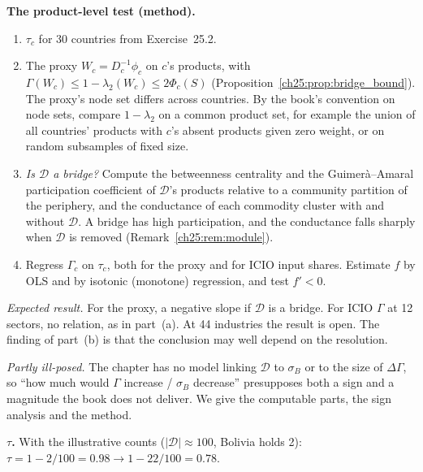 \documentclass[../solutions_manual.tex]{subfiles}
\begin{document}
 \textbf{The product-level test (method).}
\begin{enumerate}
\item $\tau_c$ for 30 countries from Exercise~25.2.
\item The proxy $W_c = D_c^{-1}\phi_c$ on $c$'s products, with $\Gamma(W_c) \le 1-\lambda_2(W_c) \le 2\Phi_c(S)$ (Proposition~\ref{ch25:prop:bridge_bound}). The proxy's node set differs across countries. By the book's convention on node sets, compare $1-\lambda_2$ on a common product set, for example the union of all countries' products with $c$'s absent products given zero weight, or on random subsamples of fixed size.
\item \emph{Is $\mathcal{D}$ a bridge?} Compute the betweenness centrality and the Guimer\`a--Amaral participation coefficient of $\mathcal{D}$'s products relative to a community partition of the periphery, and the conductance of each commodity cluster with and without $\mathcal{D}$. A bridge has high participation, and the conductance falls sharply when $\mathcal{D}$ is removed (Remark~\ref{ch25:rem:module}).
\item Regress $\Gamma_c$ on $\tau_c$, both for the proxy and for ICIO input shares. Estimate $f$ by OLS and by isotonic (monotone) regression, and test $f' < 0$.
\end{enumerate}
\emph{Expected result.} For the proxy, a negative slope if $\mathcal{D}$ is a bridge. For ICIO $\Gamma$ at 12 sectors, no relation, as in part~(a). At 44 industries the result is open. The finding of part~(b) is that the conclusion may well depend on the resolution.


\emph{Partly ill-posed.} The chapter has no model linking $\mathcal{D}$ to $\sigma_B$ or to the size of $\Delta\Gamma$, so ``how much would $\Gamma$ increase / $\sigma_B$ decrease'' presupposes both a sign and a magnitude the book does not deliver. We give the computable parts, the sign analysis and the method.

 \textbf{$\tau$.} With the illustrative counts ($|\mathcal{D}| \approx 100$, Bolivia holds 2): $\tau = 1 - 2/100 = 0.98 \to 1 - 22/100 = 0.78$.
\end{document}
